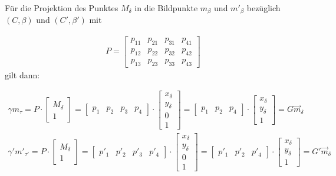 Für die Projektion des Punktes $M_\delta$ in die Bildpunkte  $m_\beta$ und $m'_{\beta}$ bezüglich $(C,\beta)$ und $(C',\beta')$ mit 

\begin{gather}
	P=
	\begin{bmatrix}
		p_{11}&p_{21}&p_{31}&p_{41}\\
		p_{12}&p_{22}&p_{32}&p_{42}\\
		p_{13}&p_{23}&p_{33}&p_{43}
	\end{bmatrix}
\end{gather} gilt dann\cite{Elements}:


\begin{gather}
	\gamma m_\tau = P \cdot 
	\begin{bmatrix}
		M_\delta\\1
	\end{bmatrix} = 
	\begin{bmatrix}
		p_1&p_2&p_3&p_4
	\end{bmatrix} \cdot
	\begin{bmatrix}
		x_\delta\\y_\delta\\0\\1
	\end{bmatrix}=
	\begin{bmatrix}
		p_1&p_2&p_4
	\end{bmatrix} \cdot
	\begin{bmatrix}
		x_\delta\\y_\delta\\1
	\end{bmatrix}=
	G \vec{m}_\delta\\
	\gamma' m'_{\tau'} = P \cdot 
	\begin{bmatrix}
		M_\delta\\1
	\end{bmatrix} = 
	\begin{bmatrix}
		p'_1&p'_2&p'_3&p'_4
	\end{bmatrix} \cdot
	\begin{bmatrix}
		x_\delta\\y_\delta\\0\\1
	\end{bmatrix}=
	\begin{bmatrix}
		p'_1&p'_2&p'_4
	\end{bmatrix} \cdot
	\begin{bmatrix}
		x_\delta\\y_\delta\\1
	\end{bmatrix}=
	G' \vec{m}_{\delta}
\end{gather}\\
 
